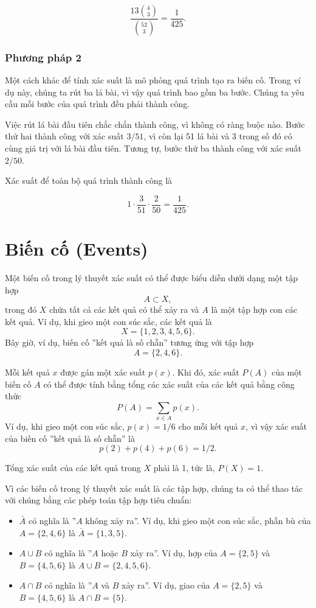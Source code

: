 \[\frac{13 {4 \choose 3}}{{52 \choose 3}} = \frac{1}{425}.\]

\subsubsection*{Phương pháp 2}

Một cách khác để tính xác suất là
mô phỏng quá trình tạo ra biến cố.
Trong ví dụ này, chúng ta rút ba lá bài, vì vậy quá trình
bao gồm ba bước.
Chúng ta yêu cầu mỗi bước của quá trình đều phải thành công.

Việc rút lá bài đầu tiên chắc chắn thành công,
vì không có ràng buộc nào.
Bước thứ hai thành công với xác suất $3/51$,
vì còn lại 51 lá bài và 3 trong số đó
có cùng giá trị với lá bài đầu tiên.
Tương tự, bước thứ ba thành công với xác suất $2/50$.

Xác suất để toàn bộ quá trình thành công là

\[1 \cdot \frac{3}{51} \cdot \frac{2}{50} = \frac{1}{425}.\]

\section{Biến cố (Events)}

Một biến cố trong lý thuyết xác suất có thể được biểu diễn dưới dạng một tập hợp
\[A \subset X,\]
trong đó $X$ chứa tất cả các kết quả có thể xảy ra
và $A$ là một tập hợp con các kết quả.
Ví dụ, khi gieo một con súc sắc, các kết quả là
\[X = \{1,2,3,4,5,6\}.\]
Bây giờ, ví dụ, biến cố ''kết quả là số chẵn''
tương ứng với tập hợp
\[A = \{2,4,6\}.\]

Mỗi kết quả $x$ được gán một xác suất $p(x)$.
Khi đó, xác suất $P(A)$ của một biến cố
$A$ có thể được tính bằng tổng
các xác suất của các kết quả bằng công thức
\[P(A) = \sum_{x \in A} p(x).\]
Ví dụ, khi gieo một con súc sắc,
$p(x)=1/6$ cho mỗi kết quả $x$,
vì vậy xác suất của biến cố
''kết quả là số chẵn'' là
\[p(2)+p(4)+p(6)=1/2.\]

Tổng xác suất của các kết quả trong $X$ phải
là 1, tức là, $P(X)=1$.

Vì các biến cố trong lý thuyết xác suất là các tập hợp,
chúng ta có thể thao tác với chúng bằng các phép toán tập hợp tiêu chuẩn:

\begin{itemize}
\item {} $\bar A$ có nghĩa là
''$A$ không xảy ra''.
Ví dụ, khi gieo một con súc sắc,
phần bù của $A=\{2,4,6\}$ là
$\bar A = \{1,3,5\}$.
\item {} $A \cup B$ có nghĩa là
''$A$ hoặc $B$ xảy ra''.
Ví dụ, hợp của
$A=\{2,5\}$
và $B=\{4,5,6\}$ là
$A \cup B = \{2,4,5,6\}$.
\item {} $A \cap B$ có nghĩa là
''$A$ và $B$ xảy ra''.
Ví dụ, giao của
$A=\{2,5\}$ và $B=\{4,5,6\}$ là
$A \cap B = \{5\}$.
\end{itemize}

